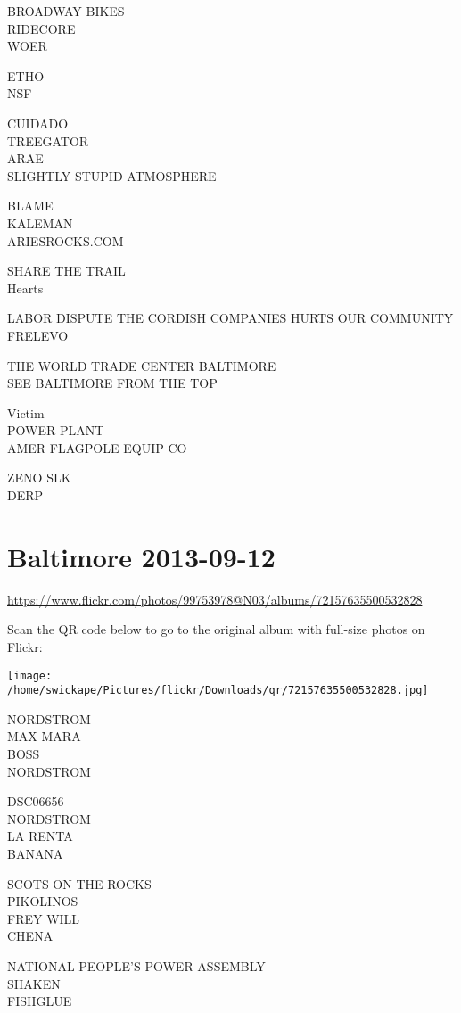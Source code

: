 \documentclass[10pt,letterpaper]{article}
\begin{document}
BROADWAY BIKES\\
RIDECORE\\
WOER

ETHO\\
NSF

CUIDADO\\
TREEGATOR\\
ARAE\\
SLIGHTLY STUPID ATMOSPHERE

BLAME\\
KALEMAN\\
ARIESROCKS.COM

SHARE THE TRAIL\\
Hearts

LABOR DISPUTE THE CORDISH COMPANIES HURTS OUR COMMUNITY\\
FRELEVO

THE WORLD TRADE CENTER BALTIMORE\\
SEE BALTIMORE FROM THE TOP

Victim\\
POWER PLANT\\
AMER FLAGPOLE EQUIP CO

ZENO SLK\\
DERP


\section*{Baltimore 2013-09-12}

\url{https://www.flickr.com/photos/99753978@N03/albums/72157635500532828}

Scan the QR code below to go to the original album with full-size photos on Flickr:

\texttt{[image: /home/swickape/Pictures/flickr/Downloads/qr/72157635500532828.jpg]}


NORDSTROM\\
MAX MARA\\
BOSS\\
NORDSTROM

DSC06656\\
NORDSTROM\\
LA RENTA\\
BANANA

SCOTS ON THE ROCKS\\
PIKOLINOS\\
FREY WILL\\
CHENA

NATIONAL PEOPLE'S POWER ASSEMBLY\\
SHAKEN\\
FISHGLUE
\end{document}
